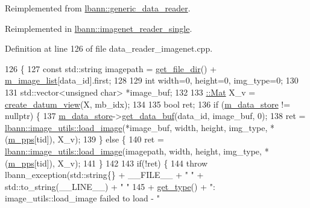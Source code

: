 Reimplemented from \hyperlink{classlbann_1_1generic__data__reader_a0a3cd87ed4a7057df185e0087f2d21c1}{lbann\+::generic\+\_\+data\+\_\+reader}.



Reimplemented in \hyperlink{classlbann_1_1imagenet__reader__single_a77c576d6085d4a8674322275dd9bd133}{lbann\+::imagenet\+\_\+reader\+\_\+single}.



Definition at line 126 of file data\+\_\+reader\+\_\+imagenet.\+cpp.


\begin{DoxyCode}
126                                                                           \{
127   \textcolor{keyword}{const} std::string imagepath = \hyperlink{classlbann_1_1generic__data__reader_ab4c6c2d4ba40ece809ce896828c8ff03}{get\_file\_dir}() + \hyperlink{classlbann_1_1image__data__reader_ae3fc949bd08c45ceafb1a03503261008}{m\_image\_list}[data\_id].first;
128 
129   \textcolor{keywordtype}{int} width=0, height=0, img\_type=0;
130 
131   std::vector<unsigned char> *image\_buf;
132 
133   \hyperlink{base_8hpp_a68f11fdc31b62516cb310831bbe54d73}{::Mat} X\_v = \hyperlink{classlbann_1_1imagenet__reader_a5c0662ebaa378f7f5b4448f4d207e872}{create\_datum\_view}(X, mb\_idx);
134 
135   \textcolor{keywordtype}{bool} ret;
136   \textcolor{keywordflow}{if} (\hyperlink{classlbann_1_1generic__data__reader_aefc076b842933a882214f4f709ca49c9}{m\_data\_store} != \textcolor{keyword}{nullptr}) \{
137     \hyperlink{classlbann_1_1generic__data__reader_aefc076b842933a882214f4f709ca49c9}{m\_data\_store}->\hyperlink{classlbann_1_1generic__data__store_a2abb3d0327b528d36e23fcef9b937798}{get\_data\_buf}(data\_id, image\_buf, 0);
138     ret = \hyperlink{classlbann_1_1image__utils_ac324a04f877601387cfb10750f1f6b8d}{lbann::image\_utils::load\_image}(*image\_buf, width, height, img\_type,
       *(\hyperlink{classlbann_1_1imagenet__reader_a1e0d0ed4ac529de3e9f735512f5e3dd8}{m\_pps}[tid]), X\_v);
139   \} \textcolor{keywordflow}{else} \{
140     ret = \hyperlink{classlbann_1_1image__utils_ac324a04f877601387cfb10750f1f6b8d}{lbann::image\_utils::load\_image}(imagepath, width, height, img\_type, 
      *(\hyperlink{classlbann_1_1imagenet__reader_a1e0d0ed4ac529de3e9f735512f5e3dd8}{m\_pps}[tid]), X\_v);
141   \}
142 
143   \textcolor{keywordflow}{if}(!ret) \{
144     \textcolor{keywordflow}{throw} lbann\_exception(std::string\{\} + \_\_FILE\_\_ + \textcolor{stringliteral}{" "} + std::to\_string(\_\_LINE\_\_) + \textcolor{stringliteral}{" "}
145                           + \hyperlink{classlbann_1_1imagenet__reader_a0afea0db8b4286b56211842f8f1d7678}{get\_type}() + \textcolor{stringliteral}{": image\_utils::load\_image failed to load - "}

\end{DoxyCode}
